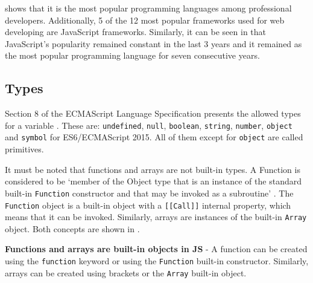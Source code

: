  shows that it is the most popular programming languages among professional developers. Additionally, 5 of the 12 most popular frameworks used for web developing are JavaScript frameworks. Similarly, it can be seen in  that JavaScript's popularity remained constant in the last 3 years and it remained as the most popular programming language for seven consecutive years.





\subsection{Types}
Section 8 of the ECMAScript Language Specification presents the allowed types for a variable \citep{ecma-script}. These are: \texttt{undefined}, \texttt{null}, \texttt{boolean}, \texttt{string}, \texttt{number}, \texttt{object} and \texttt{symbol} for ES6/ECMAScript 2015. All of them except for \texttt{object} are called primitives.

It must be noted that functions and arrays are not built-in types. A Function is considered to be `member of the Object type that is an instance of the standard built-in \texttt{Function} constructor and that may be invoked as a subroutine' \citep{ecma-script}. The \texttt{Function} object is a built-in object with a \texttt{[[Call]]} internal property, which means that it can be invoked. Similarly, arrays are instances of the built-in \texttt{Array} object. Both concepts are shown in .

\begin{code}
	\captionsetup{aboveskip=0pt, belowskip=10pt}
	\caption[Functions and arrays are built-in objects in JS]{\textbf{Functions and arrays are built-in objects in JS} - A function can be created using the \texttt{function} keyword or using the \texttt{Function} built-in constructor. Similarly, arrays can be created using brackets or the \texttt{Array} built-in object.}
	\label{code:background-functions-and-arrays}
\end{code}

